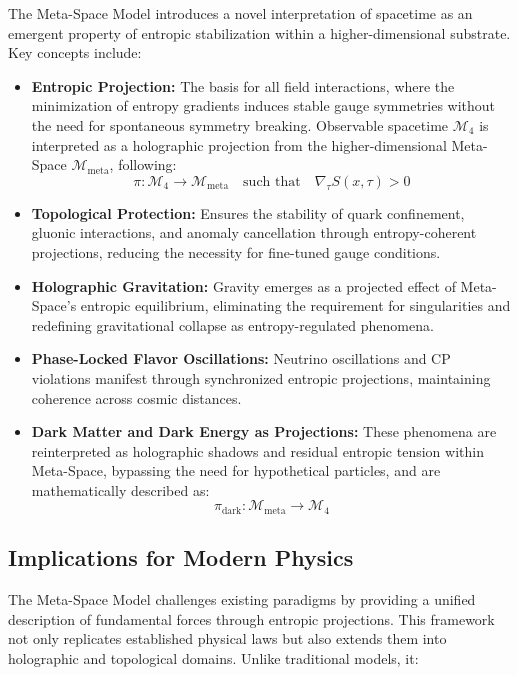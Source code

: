\documentclass[10.5pt,a4paper]{article}
\begin{document}
The Meta-Space Model introduces a novel interpretation of spacetime as an emergent property of entropic stabilization within a higher-dimensional substrate. Key concepts include:

\begin{itemize}
    \item \textbf{Entropic Projection:} The basis for all field interactions, where the minimization of entropy gradients induces stable gauge symmetries without the need for spontaneous symmetry breaking. Observable spacetime \( \mathcal{M}_4 \) is interpreted as a holographic projection from the higher-dimensional Meta-Space \( \mathcal{M}_{\text{meta}} \), following:
    \[
        \pi: \mathcal{M}_4 \rightarrow \mathcal{M}_{\text{meta}} \quad \text{such that} \quad \nabla_\tau S(x, \tau) > 0
    \]
    
    \item \textbf{Topological Protection:} Ensures the stability of quark confinement, gluonic interactions, and anomaly cancellation through entropy-coherent projections, reducing the necessity for fine-tuned gauge conditions.

    \item \textbf{Holographic Gravitation:} Gravity emerges as a projected effect of Meta-Space's entropic equilibrium, eliminating the requirement for singularities and redefining gravitational collapse as entropy-regulated phenomena.

    \item \textbf{Phase-Locked Flavor Oscillations:} Neutrino oscillations and CP violations manifest through synchronized entropic projections, maintaining coherence across cosmic distances.

    \item \textbf{Dark Matter and Dark Energy as Projections:} These phenomena are reinterpreted as holographic shadows and residual entropic tension within Meta-Space, bypassing the need for hypothetical particles, and are mathematically described as:
    \[
        \pi_{\text{dark}}: \mathcal{M}_{\text{meta}} \rightarrow \mathcal{M}_4
    \]
\end{itemize}

\subsection{Implications for Modern Physics}

The Meta-Space Model challenges existing paradigms by providing a unified description of fundamental forces through entropic projections. This framework not only replicates established physical laws but also extends them into holographic and topological domains. Unlike traditional models, it:
\end{document}
